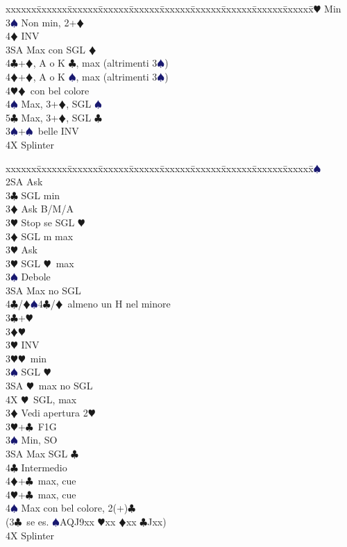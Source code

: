 \documentclass[a4paper,italian]{article}
\newcommand{\BC}{\textcolor{OliveGreen}{$\clubsuit$}}
\newcommand{\BD}{\textcolor{RedOrange}{$\vardiamondsuit$}}
\newcommand{\BH}{\textcolor{Red2}{$\varheartsuit${}}}
\newcommand{\BS}{\textcolor{MidnightBlue}{$\spadesuit${}}}
\newenvironment{bidtable}
{\begin{tabbing}

    xxxxxx\=xxxxxx\=xxxxxx\=xxxxxx\=xxxxxx\=xxxxxx\=xxxxxx\=xxxxxx\=xxxxxx\=xxxxxx\=\kill}
{\end{tabbing} }%
\begin{document}
\begin{multicols*}{2}
\begin{bidtable}
        3\BH\> Min\\
        3\BS\> Non min, 2+\BD\+\\
        4\BD\> INV\-\\
        3SA\> Max con SGL \BD\\
        4\BC{}+\BD, A o K \BC, max (altrimenti 3\BS)\\
        4\BD{}+\BD, A o K \BS, max (altrimenti 3\BS)\\
        4\BH{}\BD\ con bel colore\\
        4\BS\> Max, 3+\BD, SGL \BS\\
        5\BC\> Max, 3+\BD, SGL \BC\-\\
        3\BS {}+\BS\ belle INV\\
        4X \> Splinter\-\\
    \end{bidtable}
    \vfill
    \parbox{\textwidth}{}
    \columnbreak

    \begin{bidtable}
        2\BS\+\\
        2SA \> Ask\+\\
        3\BC \> SGL min\+\\
        3\BD \> Ask B/M/A\\
        3\BH \> Stop se SGL \BH \-\\
        3\BD \> SGL m max\+\\
        3\BH \> Ask\-\\
        3\BH \> SGL \BH\ max\\
        3\BS \> Debole\\
        3SA \> Max no SGL\\
        4\BC/\BD {}\BS 4\BC /\BD\ almeno un H nel minore\-\\
        3\BC {}+\BH \+\\
        3\BD {}\BH \+\\
        3\BH \> INV\-\\
        3\BH {}\BH\ min\\
        3\BS \> SGL \BH \\
        3SA \BH\ max no SGL\\
        4X \BH\ SGL, max\-\\
        3\BD\> Vedi apertura 2\BH\\
        3\BH {}+\BC\ F1G\+\\
        3\BS \> Min, SO\\
        3SA \> Max SGL \BC\\
        4\BC \> Intermedio\\
        4\BD {}+\BC\ max, cue\\
        4\BH {}+\BC\ max, cue\\
        4\BS \> Max con bel colore, 2(+)\BC\+\\(3\BC\ se es. \BS AQJ9xx \BH xx \BD xx \BC Jxx)\-\-\\
        4X \> Splinter\-\\
    \end{bidtable}


\end{multicols*}
\end{document}
